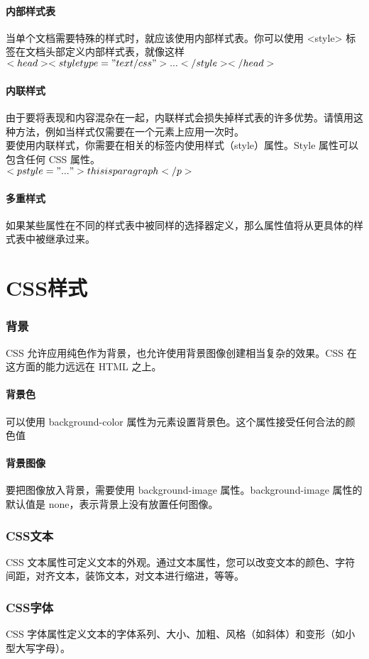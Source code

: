 \documentclass[10pt,UTF8]{ctexart}
\begin{document}
\subsection{内部样式表}
当单个文档需要特殊的样式时，就应该使用内部样式表。你可以使用 <style> 标签在文档头部定义内部样式表，就像这样\\
$<head><style type="text/css">...</style></head>$
\subsection{内联样式}
由于要将表现和内容混杂在一起，内联样式会损失掉样式表的许多优势。请慎用这种方法，例如当样式仅需要在一个元素上应用一次时。\\
要使用内联样式，你需要在相关的标签内使用样式（style）属性。Style 属性可以包含任何 CSS 属性。\\
$<p style="...">this is paragraph</p>$
\subsection{多重样式}
如果某些属性在不同的样式表中被同样的选择器定义，那么属性值将从更具体的样式表中被继承过来。

\part{CSS样式}
\section{背景}
CSS 允许应用纯色作为背景，也允许使用背景图像创建相当复杂的效果。CSS 在这方面的能力远远在 HTML 之上。
\subsection{背景色}
可以使用 background-color 属性为元素设置背景色。这个属性接受任何合法的颜色值
\subsection{背景图像}
要把图像放入背景，需要使用 background-image 属性。background-image 属性的默认值是 none，表示背景上没有放置任何图像。
\section{CSS文本}
CSS 文本属性可定义文本的外观。通过文本属性，您可以改变文本的颜色、字符间距，对齐文本，装饰文本，对文本进行缩进，等等。
\section{CSS字体}
CSS 字体属性定义文本的字体系列、大小、加粗、风格（如斜体）和变形（如小型大写字母）。
\end{document}
